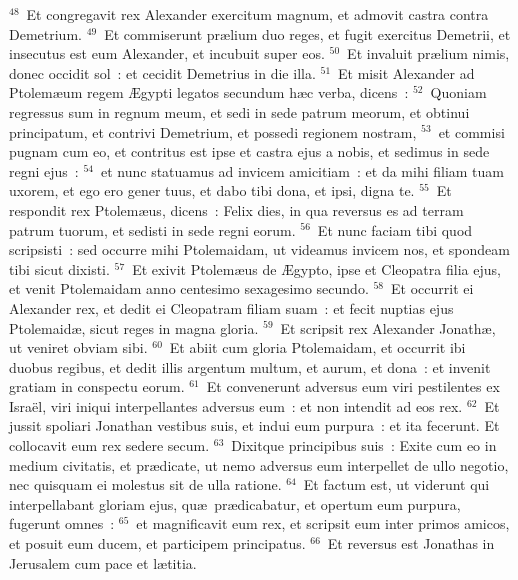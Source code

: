 ${}^{48}$~Et congregavit rex Alexander exercitum magnum, et admovit castra contra Demetrium.
${}^{49}$~Et commiserunt pr\ae lium duo reges, et fugit exercitus Demetrii, et insecutus est eum Alexander, et incubuit super eos.
${}^{50}$~Et invaluit pr\ae lium nimis, donec occidit sol~: et cecidit Demetrius in die illa.
${}^{51}$~Et misit Alexander ad Ptolem\ae um regem \AE gypti legatos secundum h\ae c verba, dicens~:
${}^{52}$~Quoniam regressus sum in regnum meum, et sedi in sede patrum meorum, et obtinui principatum, et contrivi Demetrium, et possedi regionem nostram,
${}^{53}$~et commisi pugnam cum eo, et contritus est ipse et castra ejus a nobis, et sedimus in sede regni ejus~:
${}^{54}$~et nunc statuamus ad invicem amicitiam~: et da mihi filiam tuam uxorem, et ego ero gener tuus, et dabo tibi dona, et ipsi, digna te.
${}^{55}$~Et respondit rex Ptolem\ae us, dicens~: Felix dies, in qua reversus es ad terram patrum tuorum, et sedisti in sede regni eorum.
${}^{56}$~Et nunc faciam tibi quod scripsisti~: sed occurre mihi Ptolemaidam, ut videamus invicem nos, et spondeam tibi sicut dixisti.
${}^{57}$~Et exivit Ptolem\ae us de \AE gypto, ipse et Cleopatra filia ejus, et venit Ptolemaidam anno centesimo sexagesimo secundo.
${}^{58}$~Et occurrit ei Alexander rex, et dedit ei Cleopatram filiam suam~: et fecit nuptias ejus Ptolemaid\ae , sicut reges in magna gloria.
${}^{59}$~Et scripsit rex Alexander Jonath\ae , ut veniret obviam sibi.
${}^{60}$~Et abiit cum gloria Ptolemaidam, et occurrit ibi duobus regibus, et dedit illis argentum multum, et aurum, et dona~: et invenit gratiam in conspectu eorum.
${}^{61}$~Et convenerunt adversus eum viri pestilentes ex Isra\"el, viri iniqui interpellantes adversus eum~: et non intendit ad eos rex.
${}^{62}$~Et jussit spoliari Jonathan vestibus suis, et indui eum purpura~: et ita fecerunt. Et collocavit eum rex sedere secum.
${}^{63}$~Dixitque principibus suis~: Exite cum eo in medium civitatis, et pr\ae dicate, ut nemo adversus eum interpellet de ullo negotio, nec quisquam ei molestus sit de ulla ratione.
${}^{64}$~Et factum est, ut viderunt qui interpellabant gloriam ejus, qu\ae\ pr\ae dicabatur, et opertum eum purpura, fugerunt omnes~:
${}^{65}$~et magnificavit eum rex, et scripsit eum inter primos amicos, et posuit eum ducem, et participem principatus.
${}^{66}$~Et reversus est Jonathas in Jerusalem cum pace et l\ae titia.


